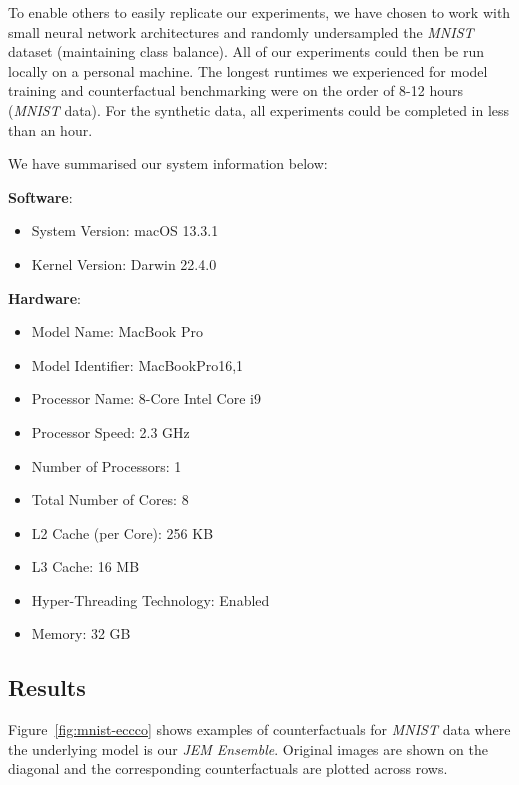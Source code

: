 \documentclass{article}
\begin{document}
To enable others to easily replicate our experiments, we have chosen to work with small neural network architectures and randomly undersampled the \textit{MNIST} dataset (maintaining class balance). All of our experiments could then be run locally on a personal machine. The longest runtimes we experienced for model training and counterfactual benchmarking were on the order of 8-12 hours (\textit{MNIST} data). For the synthetic data, all experiments could be completed in less than an hour. 

We have summarised our system information below:

\textbf{Software}:

\begin{itemize}
  \item System Version: macOS 13.3.1
  \item Kernel Version: Darwin 22.4.0
\end{itemize}

\textbf{Hardware}:

\begin{itemize}
  \item Model Name: MacBook Pro
  \item Model Identifier: MacBookPro16,1
  \item Processor Name: 8-Core Intel Core i9
  \item Processor Speed: 2.3 GHz
  \item Number of Processors: 1
  \item Total Number of Cores: 8
  \item L2 Cache (per Core): 256 KB
  \item L3 Cache: 16 MB
  \item Hyper-Threading Technology: Enabled
  \item Memory: 32 GB
\end{itemize}


\subsection{Results}\label{app:results}

Figure~\ref{fig:mnist-eccco} shows examples of counterfactuals for \textit{MNIST} data where the underlying model is our \textit{JEM Ensemble}. Original images are shown on the diagonal and the corresponding counterfactuals are plotted across rows.
\end{document}
